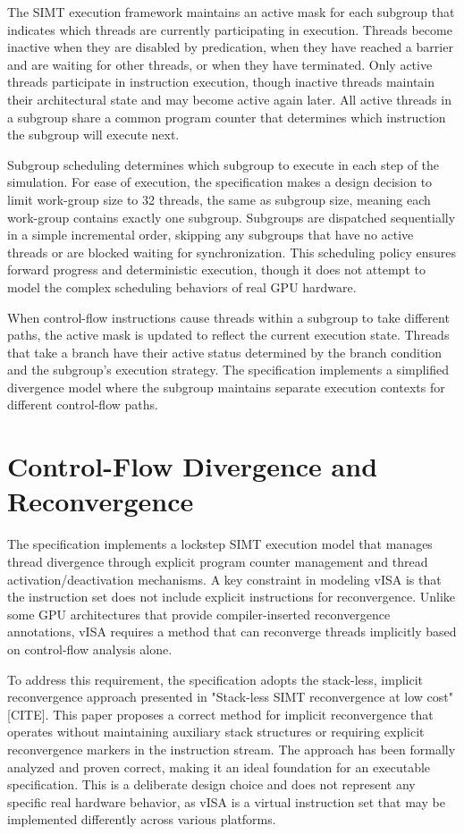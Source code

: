The SIMT execution framework maintains an active mask for each subgroup that
indicates which threads are currently participating in execution. Threads
become inactive when they are disabled by predication, when they have reached a
barrier and are waiting for other threads, or when they have terminated. Only
active threads participate in instruction execution, though inactive threads
maintain their architectural state and may become active again later. All
active threads in a subgroup share a common program counter that determines
which instruction the subgroup will execute next.

Subgroup scheduling determines which subgroup to execute in each step of the
simulation. For ease of execution, the specification makes a design decision to
limit work-group size to 32 threads, the same as subgroup size, meaning each
work-group contains exactly one subgroup. Subgroups are dispatched sequentially
in a simple incremental order, skipping any subgroups that have no active
threads or are blocked waiting for synchronization. This scheduling policy
ensures forward progress and deterministic execution, though it does not
attempt to model the complex scheduling behaviors of real GPU hardware.

When control-flow instructions cause threads within a subgroup to take
different paths, the active mask is updated to reflect the current execution
state. Threads that take a branch have their active status determined by the
branch condition and the subgroup's execution strategy. The specification
implements a simplified divergence model where the subgroup maintains separate
execution contexts for different control-flow paths.



\section{Control-Flow Divergence and Reconvergence}

The specification implements a lockstep SIMT execution model that manages
thread divergence through explicit program counter management and thread
activation/deactivation mechanisms. A key constraint in modeling vISA is that
the instruction set does not include explicit instructions for reconvergence.
Unlike some GPU architectures that provide compiler-inserted reconvergence
annotations, vISA requires a method that can reconverge threads implicitly
based on control-flow analysis alone.

To address this requirement, the specification adopts the stack-less, implicit
reconvergence approach presented in "Stack-less SIMT reconvergence at low cost"
[CITE]. This paper proposes a correct method for implicit reconvergence that
operates without maintaining auxiliary stack structures or requiring explicit
reconvergence markers in the instruction stream. The approach has been formally
analyzed and proven correct, making it an ideal foundation for an executable
specification. This is a deliberate design choice and does not represent any
specific real hardware behavior, as vISA is a virtual instruction set that may
be implemented differently across various platforms.

